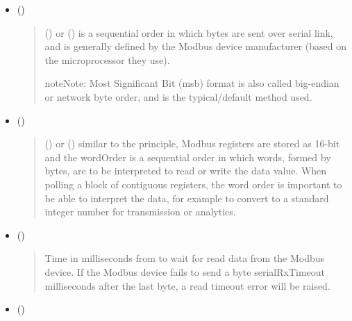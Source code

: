 \documentclass[letterpaper,10pt,english]{sphinxmanual}
\begin{document}
\begin{itemize}
\item {} 
 ()
\begin{quote}

 () or  () is a sequential order in which bytes are sent over serial link, and is generally defined by the Modbus device manufacturer (based on the microprocessor they use).

\begin{sphinxadmonition}{note}{Note:}
Most Significant Bit (msb) format is also called big-endian or network byte order, and is the typical/default method used.
\end{sphinxadmonition}
\end{quote}

\item {} 
 ()
\begin{quote}

 () or  () similar to the  principle, Modbus registers are stored as 16-bit  and the wordOrder is a sequential order in which words, formed by bytes, are to be interpreted to read or write the data value.
When polling a block of contiguous registers, the word order is important to be able to interpret the data, for example to convert to a standard integer number for transmission or analytics.
\end{quote}

\item {} 
 ()
\begin{quote}

Time in milliseconds from  to wait for read data from the Modbus device.
If the Modbus device fails to send a byte serialRxTimeout milliseconds after the last byte, a read timeout error will be raised.
\end{quote}

\item {} 
 ()
\begin{quote}


\end{quote}
\end{itemize}
\end{document}
